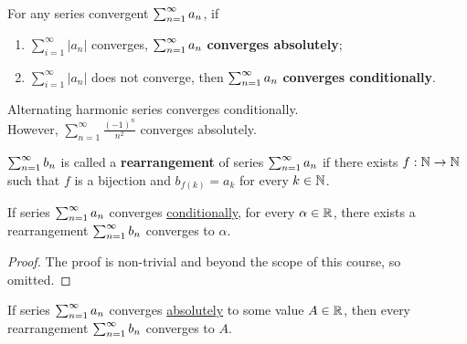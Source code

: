 \documentclass[11pt]{article}
\begin{document}
	\begin{definition}
		For any series convergent $\sum_{{n}=1}^\infty {a}_{n}$, if 
		\begin{enumerate}
			\item $\sum_{i=1}^\infty |a_n|$ converges, $\sum_{{n}=1}^\infty {a}_{n}$ \textbf{converges absolutely};
			\item $\sum_{i=1}^\infty |a_n|$ does not converge, then $\sum_{{n}=1}^\infty {a}_{n}$ \textbf{converges conditionally}.
		\end{enumerate}
	\end{definition}
	
	\begin{example}
		Alternating harmonic series converges conditionally. \\However, $\sum_{n=1}^\infty \frac{(-1)^n}{n^2}$ converges absolutely.
	\end{example}
	
	\begin{definition}
		$\sum_{{n}=1}^\infty {b}_{n}$ is called a \textbf{rearrangement} of series $\sum_{{n}=1}^\infty {a}_{n}$ if there exists $f: \mathbb{N} \to \mathbb{N}$ such that $f$ is a bijection and $b_{f(k)} = a_k$ for every $k \in \mathbb{N}$.
	\end{definition}
	
	\begin{theorem}
		If series $\sum_{{n}=1}^\infty {a}_{n}$ converges \ul{conditionally}, for every $\alpha \in \mathbb{R}$, there exists a rearrangement $\sum_{{n}=1}^\infty {b}_{n}$ converges to $\alpha$.
	\end{theorem}
	
	\begin{proof}
		The proof is non-trivial and beyond the scope of this course, so omitted.
	\end{proof}
	
	\begin{theorem}
		If series $\sum_{{n}=1}^\infty {a}_{n}$ converges \ul{absolutely} to some value $A \in \mathbb{R}$, then every rearrangement $\sum_{{n}=1}^\infty {b}_{n}$ converges to $A$.
	\end{theorem}
	
\end{document}
